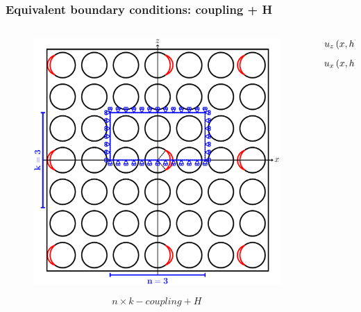 \documentclass[first,firstsupp,lastsupp,last,hyperref,table]{ETHclass}
\begin{document}
\begin{frame}
\frametitle{\vspace{0.2cm}\small Equivalent boundary conditions: coupling + H}
\vspace{-1.25cm}
\centering
\begin{columns}[c]
\begin{column}{0.5\textwidth}
\centering
\begin{figure}
\centering
\includegraphics[width=\columnwidth]{coupling.pdf}
\end{figure}
\vspace{-0.25cm}
\begin{equation*}
n\times k-coupling+H
\end{equation*}
\end{column}
\begin{column}{0.5\textwidth}
\centering
\begin{equation*}
\scriptsize
u_{z}\left(x,h\right)=\bar{u}_{z}\left(x,h\right)
\end{equation*}
\begin{equation*}
\scriptsize
u_{x}\left(x,h\right)=\bar{\varepsilon}_{x}x
\end{equation*}
\end{column}
\end{columns}
\end{frame}
\end{document}
